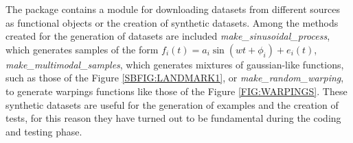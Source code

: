 
The package contains a module for downloading datasets from different sources
as functional objects or the creation of synthetic datasets.
Among the methods created for the generation of datasets are included
\textit{make\_sinusoidal\_process}, which generates samples of the form
$f_i(t)=a_i\sin(wt + \phi_i) + e_i(t)$,
\textit{make\_multimodal\_samples}, which generates mixtures of gaussian-like
functions, such as those of the Figure \ref{SBFIG:LANDMARK1},
 or \textit{make\_random\_warping}, to generate warpings functions like
 those of the Figure \ref{FIG:WARPINGS}.
 These synthetic datasets are useful for the generation of examples and the
 creation of tests, for this reason they have turned out to be fundamental
 during the coding and testing phase.
